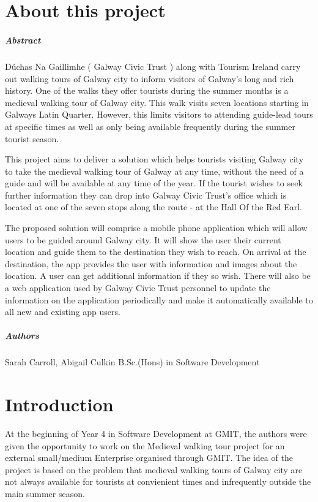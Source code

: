 \chapter*{About this project}
\paragraph{Abstract}

Dúchas Na Gaillimhe ( Galway Civic Trust ) along with Tourism Ireland carry out walking tours of Galway city to inform visitors of Galway's long and rich history. One of the walks they offer tourists during the summer months is a medieval walking tour of Galway city. This walk visits seven locations starting in Galways Latin Quarter. However, this limits visitors to attending guide-lead tours at specific times as well as only being available frequently during the summer tourist season.

This project aims to deliver a solution which helps tourists visiting Galway city to take the medieval walking tour of Galway at any time, without the need of a guide and will be available at any time of the year. If the tourist wishes to seek further information they can drop into Galway Civic Trust's office which is located at one of the seven stops along the route - at the Hall Of the Red Earl.

The proposed solution will comprise a mobile phone application which will allow users to be guided around Galway city. It will show the user their current location and guide them to the destination they wish to reach. On arrival at the destination, the app provides the user with information and images about the location. A user can get additional information if they so wish. There will also be a web application used by Galway Civic Trust personnel to update the information on the application periodically and make it automatically available to all new and existing app users.

\paragraph{Authors}
Sarah Carroll, Abigail Culkin
B.Sc.(Hons) in Software Development

\chapter{Introduction}

At the beginning of Year 4 in Software Development at GMIT, the authors were given the opportunity to work on the Medieval walking tour project for an external small/medium Enterprise organised through GMIT. The idea of the project is based on the problem that medieval walking tours of Galway city are not always available for tourists at convienient times and infrequently outside the main summer season. 


